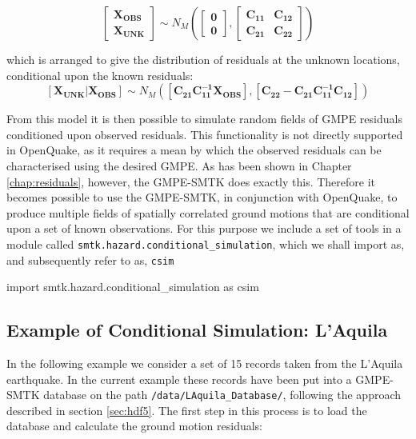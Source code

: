 \begin{equation}
\begin{bmatrix}\mathbf{X_{OBS}}\\ \hline \mathbf{X_{UNK}}\end{bmatrix} \sim N_M \left( {\begin{bmatrix}\mathbf{0} \\ \hline \mathbf{0}\end{bmatrix}, \left[ {\begin{array}{c|c}\mathbf{C_{11}} & \mathbf{C_{12}} \\ \hline \mathbf{C_{21}} & \mathbf{C_{22}}\end{array}}\right]}\right)
\end{equation}

\noindent which is arranged to give the distribution of residuals at the unknown locations, conditional upon the known residuals:
\begin{equation}
\left[ {\mathbf{X_{UNK}} | \mathbf{X_{OBS}}} \right] \sim N_M \left( {\left[ {\mathbf{C_{21}C_{11}^{-1}X_{OBS}}} \right], \left[ {\mathbf{C_{22}} - \mathbf{C_{21}C_{11}^{-1}C_{12}}}\right]}\right)
\end{equation}

From this model it is then possible to simulate random fields of GMPE residuals conditioned upon observed residuals. This functionality is not directly supported in OpenQuake, as it requires a mean by which the observed residuals can be characterised using the desired GMPE. As has been shown in Chapter \ref{chap:residuals}, however, the GMPE-SMTK does exactly this. Therefore it becomes possible to use the GMPE-SMTK, in conjunction with OpenQuake, to produce multiple fields of spatially correlated ground motions that are conditional upon a set of known observations. For this purpose we include a set of tools in a module called \verb=smtk.hazard.conditional_simulation=, which we shall import as, and subsequently refer to as, \verb=csim=

\begin{python}
import smtk.hazard.conditional_simulation as csim
\end{python}

\subsection{Example of Conditional Simulation: L'Aquila}

In the following example we consider a set of 15 records taken from the L'Aquila earthquake. In the current example these records have been put into a GMPE-SMTK database on the path \verb=/data/LAquila_Database/=, following the approach described in section \ref{sec:hdf5}. The first step in this process is to load the database and calculate the ground motion residuals:

